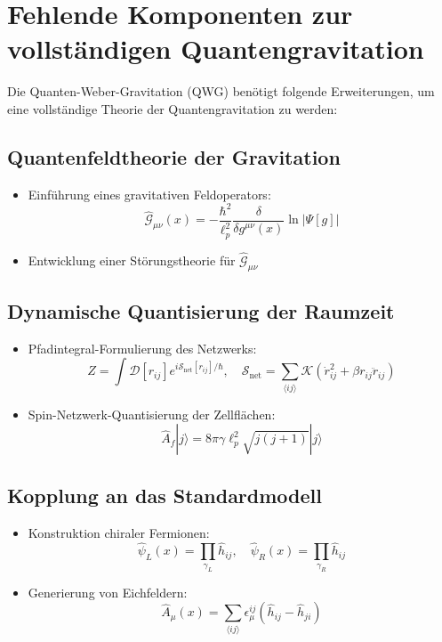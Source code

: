 \section{Fehlende Komponenten zur vollständigen Quantengravitation}

Die Quanten-Weber-Gravitation (QWG) benötigt folgende Erweiterungen, um eine vollständige Theorie der Quantengravitation zu werden:

\subsection{Quantenfeldtheorie der Gravitation}
\begin{itemize}
    \item Einführung eines gravitativen Feldoperators:
    \begin{equation}
        \hat{\mathcal{G}}_{\mu\nu}(x) = -\frac{\hbar^2}{\ell_p^2} \frac{\delta}{\delta g^{\mu\nu}(x)} \ln|\Psi[g]|
    \end{equation}
    \item Entwicklung einer Störungstheorie für $\hat{\mathcal{G}}_{\mu\nu}$
\end{itemize}

\subsection{Dynamische Quantisierung der Raumzeit}
\begin{itemize}
    \item Pfadintegral-Formulierung des Netzwerks:
    \begin{equation}
        Z = \int \mathcal{D}[r_{ij}] e^{i\mathcal{S}_{\text{net}}[r_{ij}]/\hbar}, \quad \mathcal{S}_{\text{net}} = \sum_{\langle ij \rangle} \mathcal{K}\left(\dot{r}_{ij}^2 + \beta r_{ij}\ddot{r}_{ij}\right)
    \end{equation}
    \item Spin-Netzwerk-Quantisierung der Zellflächen:
    \begin{equation}
        \hat{A}_f|j\rangle = 8\pi\gamma\ell_p^2\sqrt{j(j+1)}|j\rangle
    \end{equation}
\end{itemize}

\subsection{Kopplung an das Standardmodell}
\begin{itemize}
    \item Konstruktion chiraler Fermionen:
    \begin{equation}
        \hat{\psi}_L(x) = \prod_{\gamma_L} \hat{h}_{ij}, \quad \hat{\psi}_R(x) = \prod_{\gamma_R} \hat{h}_{ij}
    \end{equation}
    \item Generierung von Eichfeldern:
    \begin{equation}
        \hat{A}_\mu(x) = \sum_{\langle ij \rangle} \epsilon_\mu^{ij}(\hat{h}_{ij} - \hat{h}_{ji})
    \end{equation}
\end{itemize}

